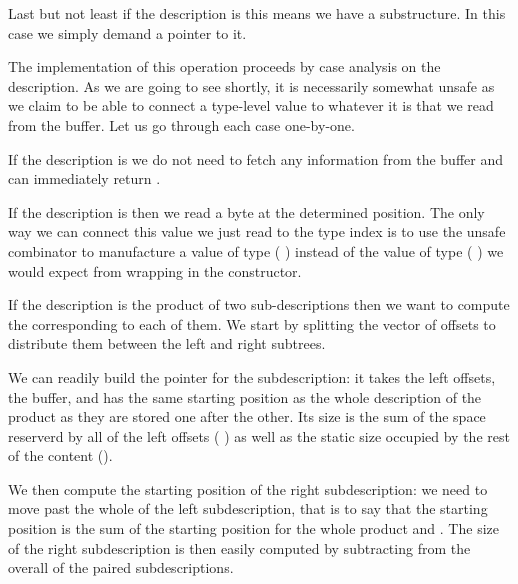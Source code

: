 Last but not least if the description is  this means
we have a substructure. In this case we simply demand a pointer to it.


The implementation of this operation proceeds by case analysis
on the description.
%
As we are going to see shortly, it is necessarily somewhat unsafe
as we claim to be able to connect a type-level value to whatever
it is that we read from the buffer.
%
Let us go through each case one-by-one.


If the description is  we do not need to fetch any
information from the buffer and can immediately return \IdrisData{()}.


If the description is  then we read a byte at the
determined position. The only way we can connect this value we just
read to the type index is to use the unsafe combinator
 to manufacture a value of type
( ) instead of the value of type
( )
we would expect from wrapping  in the  constructor.



If the description is the product of two sub-descriptions then we
want to compute the  corresponding to
each of them.
%
We start by splitting the vector of offsets to distribute them between
the left and right subtrees.

We can readily build the pointer for the  subdescription:
it takes the left offsets, the buffer, and has the same starting position
as the whole description of the product as they are stored one after the other.
Its size is the sum of the space reserverd by all of the left offsets
( ) as well as the static size occupied
by the rest of the content  ().

We then compute the starting position of the right subdescription: we need to
move past the whole of the left subdescription, that is to say that the starting
position is the sum of the starting position for the whole product and .
%
The size of the right subdescription is then easily computed by subtracting
 from the overall  of the paired subdescriptions.

